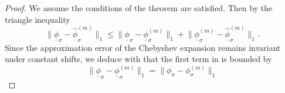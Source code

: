 \begin{proof}
    We assume the conditions of the theorem are satisfied. Then by the triangle inequality
    \begin{equation}
        \lVert \underline{\phi}_{\sigma} - \widehat{\underline{\phi}}_{\sigma}^{(m)}  \rVert _1
        \leq \lVert \underline{\phi}_{\sigma} - \underline{\phi}_{\sigma}^{(m)} \rVert _1
        + \lVert \underline{\phi}_{\sigma}^{(m)} - \widehat{\underline{\phi}}_{\sigma}^{(m)} \rVert _1.
        \label{equ:3-nystrom-nystrom-chebyshev-proof-triangle}
    \end{equation}
    Since the approximation error of the Chebyshev expansion remains invariant
    under constant shifts, we deduce with  that the
    first term in  is bounded by
    \begin{equation}
        \lVert \underline{\phi}_{\sigma} - \underline{\phi}_{\sigma}^{(m)} \rVert _1
        = \lVert \phi_{\sigma} - \phi_{\sigma}^{(m)} \rVert _1

\end{equation}
\end{proof}
